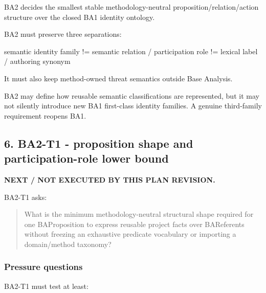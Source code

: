 \documentclass[
  10pt,
  a4paper,
]{article}
\newenvironment{Shaded}{}{}
\newcommand{\NormalTok}[1]{#1}
\begin{document}
BA2 decides the smallest stable methodology-neutral
proposition/relation/action structure over the closed BA1 identity
ontology.

BA2 must preserve three separations:

\begin{Shaded}
\begin{Highlighting}[]
\NormalTok{semantic identity family}
\NormalTok{    !=}
\NormalTok{semantic relation / participation role}
\NormalTok{    !=}
\NormalTok{lexical label / authoring synonym}
\end{Highlighting}
\end{Shaded}

It must also keep method-owned threat semantics outside Base Analysis.

BA2 may define how reusable semantic classifications are represented,
but it may not silently introduce new BA1 first-class identity families.
A genuine third-family requirement reopens BA1.

\subsection{6. BA2-T1 - proposition shape and participation-role lower
bound}\label{ba2-t1---proposition-shape-and-participation-role-lower-bound}

\textbf{NEXT / NOT EXECUTED BY THIS PLAN REVISION.}

BA2-T1 asks:

\begin{quote}
What is the minimum methodology-neutral structural shape required for
one BAProposition to express reusable project facts over BAReferents
without freezing an exhaustive predicate vocabulary or importing a
domain/method taxonomy?
\end{quote}

\subsubsection{Pressure questions}\label{pressure-questions}

BA2-T1 must test at least:
\end{document}
